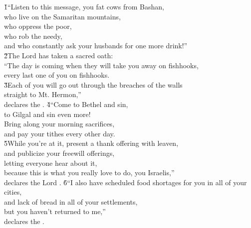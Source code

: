 \begin{poetry}
\poeml {}
\v{1}``Listen to this message, you fat cows from Bashan, \\
\poeml who live on the Samaritan mountains, \\
\poemll    who oppress the poor, \\
\poeml who rob the needy, \\
\poemll    and who constantly ask your husbands for one more drink!'' \\
\poeml \v{2}The Lord  has taken a sacred oath: \\
\poeml ``The day is coming when they will take you away on fishhooks, \\
\poemll    every last one of you on fishhooks. \\
\poeml \v{3}Each of you will go out through the breaches of the walls \\
\poemll    straight to Mt. Hermon,'' \\
\poemlll       declares the .
\poeml \v{4}``Come to Bethel and sin, \\
\poemll    to Gilgal and sin even more! \\
\poeml Bring along your morning sacrifices, \\
\poemll    and pay your tithes every other day. \\
\poeml \v{5}While you're at it, present a thank offering with leaven, \\
\poemll    and publicize your freewill offerings, \\
\poeml letting everyone hear about it, \\
\poemll    because this is what you really love to do, you Israelis,'' \\
\poemlll       declares the Lord .
\poeml \v{6}``I also have scheduled food shortages for you in all of your cities, \\
\poemll    and lack of bread in all of your settlements, \\
\poeml but you haven't returned to me,'' \\
\poemll    declares the . \\

\end{poetry}
